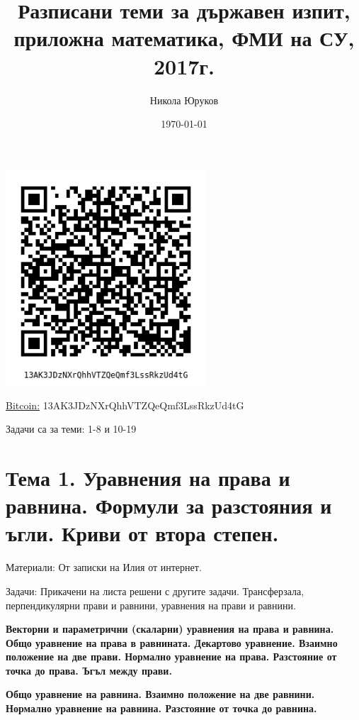 \documentclass[11pt]{article}
\title{Разписани теми за държавен изпит, приложна математика, ФМИ на СУ, 2017г.}
\author{Никола Юруков}
\date{\today}
\numberwithin{equation}{section}
\numberwithin{figure}{section}
\numberwithin{table}{section}
\theoremstyle{plain}
\theoremstyle{definition}
\theoremstyle{remark}
\theoremstyle{definition}
\theoremstyle{remark}
\theoremstyle{plain}
\theoremstyle{definition}
\theoremstyle{definition}
\theoremstyle{plain}
\theoremstyle{plain}
\theoremstyle{plain}
\theoremstyle{definition}
\theoremstyle{plain}
\begin{document}
\maketitle
\vspace{60mm}

\begin{center}
\includegraphics[height=8cm]{bitcoin-donation.png}

\href{bitcoin:13AK3JDzNXrQhhVTZQeQmf3LssRkzUd4tG?label=State%20Exam%202017%20Applied%20mathematics%20Donations%20link&message=Thank%20you%20for%20your%20help}{Bitcoin:} 13AK3JDzNXrQhhVTZQeQmf3LssRkzUd4tG
\end{center}

\clearpage

\tableofcontents

\clearpage

Задачи са за теми: 1-8 и 10-19

\section{Тема 1. Уравнения на права и равнина. Формули за разстояния и ъгли. Криви от втора степен.}

Материали: От записки на Илия от интернет.

Задачи: Прикачени на листа решени с другите задачи. Трансферзала, перпендикулярни прави и равнини, уравнения на прави и равнини.

\textbf{Векторни и параметрични (скаларни) уравнения на права и равнина. Общо уравнение на права в равнината. Декартово уравнение. Взаимно положение на две прави. Нормално уравнение на права. Разстояние от точка до права. Ъгъл между прави.}

\textbf{Общо уравнение на равнина. Взаимно положение на две равнини. Нормално уравнение на равнина. Разстояние от точка до равнина.}
\end{document}
